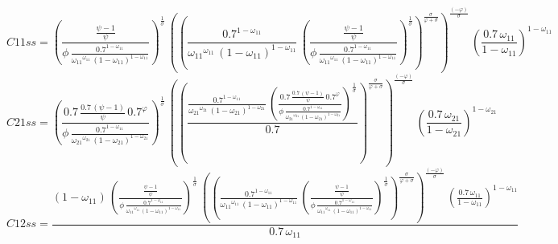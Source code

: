 \begin{dmath*}
C11ss = \left(\frac{\frac{{{\psi}}-1}{{{\psi}}}}{{{\phi}}\, \frac{0.7^{1-{{\omega_{11}}}}}{{{\omega_{11}}}^{{{\omega_{11}}}}\, \left(1-{{\omega_{11}}}\right)^{1-{{\omega_{11}}}}}}\right)^{\frac{1}{{{\sigma}}}}\, \left(\left(\frac{0.7^{1-{{\omega_{11}}}}}{{{\omega_{11}}}^{{{\omega_{11}}}}\, \left(1-{{\omega_{11}}}\right)^{1-{{\omega_{11}}}}}\, \left(\frac{\frac{{{\psi}}-1}{{{\psi}}}}{{{\phi}}\, \frac{0.7^{1-{{\omega_{11}}}}}{{{\omega_{11}}}^{{{\omega_{11}}}}\, \left(1-{{\omega_{11}}}\right)^{1-{{\omega_{11}}}}}}\right)^{\frac{1}{{{\sigma}}}}\right)^{\frac{{{\sigma}}}{{{\varphi}}+{{\sigma}}}}\right)^{\frac{\left(-{{\varphi}}\right)}{{{\sigma}}}}\, \left(\frac{0.7\, {{\omega_{11}}}}{1-{{\omega_{11}}}}\right)^{1-{{\omega_{11}}}}
\end{dmath*}
\begin{dmath*}
C21ss = \left(\frac{0.7\, \frac{0.7\, \left({{\psi}}-1\right)}{{{\psi}}}\, 0.7^{{{\varphi}}}}{{{\phi}}\, \frac{0.7^{1-{{\omega_{11}}}}}{{{\omega_{21}}}^{{{\omega_{21}}}}\, \left(1-{{\omega_{21}}}\right)^{1-{{\omega_{21}}}}}}\right)^{\frac{1}{{{\sigma}}}}\, \left(\left(\frac{\frac{0.7^{1-{{\omega_{11}}}}}{{{\omega_{21}}}^{{{\omega_{21}}}}\, \left(1-{{\omega_{21}}}\right)^{1-{{\omega_{21}}}}}\, \left(\frac{0.7\, \frac{0.7\, \left({{\psi}}-1\right)}{{{\psi}}}\, 0.7^{{{\varphi}}}}{{{\phi}}\, \frac{0.7^{1-{{\omega_{11}}}}}{{{\omega_{21}}}^{{{\omega_{21}}}}\, \left(1-{{\omega_{21}}}\right)^{1-{{\omega_{21}}}}}}\right)^{\frac{1}{{{\sigma}}}}}{0.7}\right)^{\frac{{{\sigma}}}{{{\varphi}}+{{\sigma}}}}\right)^{\frac{\left(-{{\varphi}}\right)}{{{\sigma}}}}\, \left(\frac{0.7\, {{\omega_{21}}}}{1-{{\omega_{21}}}}\right)^{1-{{\omega_{21}}}}
\end{dmath*}
\begin{dmath*}
C12ss = \frac{\left(1-{{\omega_{11}}}\right)\, \left(\frac{\frac{{{\psi}}-1}{{{\psi}}}}{{{\phi}}\, \frac{0.7^{1-{{\omega_{11}}}}}{{{\omega_{11}}}^{{{\omega_{11}}}}\, \left(1-{{\omega_{11}}}\right)^{1-{{\omega_{11}}}}}}\right)^{\frac{1}{{{\sigma}}}}\, \left(\left(\frac{0.7^{1-{{\omega_{11}}}}}{{{\omega_{11}}}^{{{\omega_{11}}}}\, \left(1-{{\omega_{11}}}\right)^{1-{{\omega_{11}}}}}\, \left(\frac{\frac{{{\psi}}-1}{{{\psi}}}}{{{\phi}}\, \frac{0.7^{1-{{\omega_{11}}}}}{{{\omega_{11}}}^{{{\omega_{11}}}}\, \left(1-{{\omega_{11}}}\right)^{1-{{\omega_{11}}}}}}\right)^{\frac{1}{{{\sigma}}}}\right)^{\frac{{{\sigma}}}{{{\varphi}}+{{\sigma}}}}\right)^{\frac{\left(-{{\varphi}}\right)}{{{\sigma}}}}\, \left(\frac{0.7\, {{\omega_{11}}}}{1-{{\omega_{11}}}}\right)^{1-{{\omega_{11}}}}}{0.7\, {{\omega_{11}}}}
\end{dmath*}
